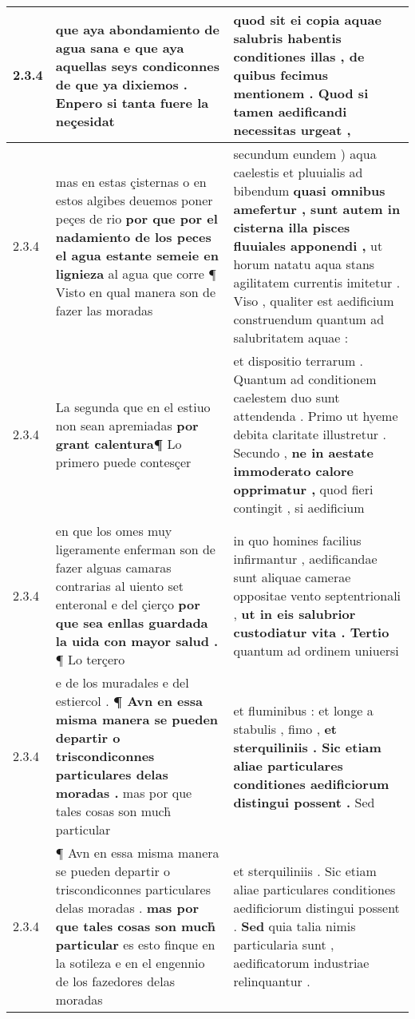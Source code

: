 \begin{tabular}{|p{1cm}|p{6.5cm}|p{6.5cm}|}
2.3.4 & que aya abondamiento de agua sana \textbf{ e que aya aquellas seys condiconnes de que ya dixiemos . } Enpero si tanta fuere la neçesidat & quod sit ei copia aquae salubris habentis conditiones illas , \textbf{ de quibus fecimus mentionem . } Quod si tamen aedificandi necessitas urgeat , \\\hline
2.3.4 & mas en estas çisternas o en estos algibes deuemos poner peçes de rio \textbf{ por que por el nadamiento de los peces el agua estante semeie en lignieza } al agua que corre ¶ Visto en qual manera son de fazer las moradas & secundum eundem ) aqua caelestis et pluuialis ad bibendum \textbf{ quasi omnibus amefertur , sunt autem in cisterna illa pisces fluuiales apponendi , } ut horum natatu aqua stans agilitatem currentis imitetur . Viso , qualiter est aedificium construendum quantum ad salubritatem aquae : \\\hline
2.3.4 & La segunda que en el estiuo non sean apremiadas \textbf{ por grant calentura¶ } Lo primero puede contesçer & et dispositio terrarum . Quantum ad conditionem caelestem duo sunt attendenda . Primo ut hyeme debita claritate illustretur . Secundo , \textbf{ ne in aestate immoderato calore opprimatur , } quod fieri contingit , si aedificium \\\hline
2.3.4 & en que los omes muy ligeramente enferman son de fazer alguas camaras contrarias al uiento set enteronal e del çierço \textbf{ por que sea enllas guardada la uida con mayor salud . } ¶ Lo terçero & in quo homines facilius infirmantur , aedificandae sunt aliquae camerae oppositae vento septentrionali , \textbf{ ut in eis salubrior custodiatur vita . Tertio } quantum ad ordinem uniuersi \\\hline
2.3.4 & e de los muradales e del estiercol . \textbf{ ¶ Avn en essa misma manera se pueden departir o triscondiconnes particulares delas moradas . } mas por que tales cosas son much̉ particular & et fluminibus : et longe a stabulis , fimo , \textbf{ et sterquiliniis . Sic etiam aliae particulares conditiones aedificiorum distingui possent . } Sed \\\hline
2.3.4 & ¶ Avn en essa misma manera se pueden departir o triscondiconnes particulares delas moradas . \textbf{ mas por que tales cosas son much̉ particular } es esto finque en la sotileza e en el engennio de los fazedores delas moradas & et sterquiliniis . Sic etiam aliae particulares conditiones aedificiorum distingui possent . \textbf{ Sed } quia talia nimis particularia sunt , aedificatorum industriae relinquantur . \\\hline

\end{tabular}

